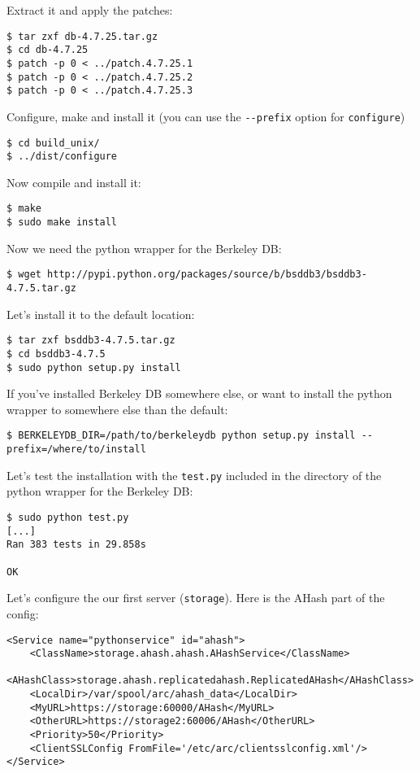 \documentclass{book}
\begin{document}
Extract it and apply the patches:
\begin{verbatim}
$ tar zxf db-4.7.25.tar.gz
$ cd db-4.7.25
$ patch -p 0 < ../patch.4.7.25.1
$ patch -p 0 < ../patch.4.7.25.2
$ patch -p 0 < ../patch.4.7.25.3
\end{verbatim}

Configure, make and install it (you can use the \verb!--prefix! option for \verb!configure!)
\begin{verbatim}
$ cd build_unix/
$ ../dist/configure
\end{verbatim}

Now compile and install it:
\begin{verbatim}
$ make
$ sudo make install
\end{verbatim}

Now we need the python wrapper for the Berkeley DB:

\begin{verbatim}
$ wget http://pypi.python.org/packages/source/b/bsddb3/bsddb3-4.7.5.tar.gz
\end{verbatim}

Let's install it to the default location:

\begin{verbatim}
$ tar zxf bsddb3-4.7.5.tar.gz
$ cd bsddb3-4.7.5
$ sudo python setup.py install
\end{verbatim}

If you've installed Berkeley DB somewhere else, or want to install the python wrapper to somewhere else than the default:

\begin{verbatim}
$ BERKELEYDB_DIR=/path/to/berkeleydb python setup.py install --prefix=/where/to/install
\end{verbatim}

Let's test the installation with the \verb!test.py! included in the directory of the python wrapper for the Berkeley DB:
\begin{verbatim}
$ sudo python test.py
[...]
Ran 383 tests in 29.858s

OK
\end{verbatim}

Let's configure the our first server (\verb!storage!). Here is the AHash part of the config:

\begin{verbatim}
<Service name="pythonservice" id="ahash">
    <ClassName>storage.ahash.ahash.AHashService</ClassName>
    <AHashClass>storage.ahash.replicatedahash.ReplicatedAHash</AHashClass>
    <LocalDir>/var/spool/arc/ahash_data</LocalDir>
    <MyURL>https://storage:60000/AHash</MyURL>
    <OtherURL>https://storage2:60006/AHash</OtherURL>
    <Priority>50</Priority>
    <ClientSSLConfig FromFile='/etc/arc/clientsslconfig.xml'/>
</Service>
\end{verbatim}
\end{document}
